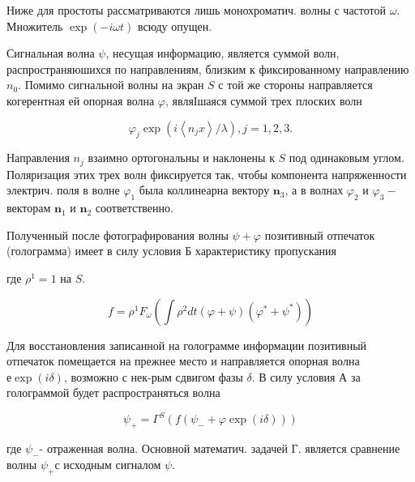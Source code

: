 \documentclass[10pt]{article}
\begin{document}
Ниже для простоты рассматриваются лишь монохроматич. волны с частотой $\omega$. Множитель $\exp (-i \omega t)$ всюду опущен.



Сигнальная волна $\psi$, несущая информацию, является суммой волн, распространяюшихся по направлениям, близким к фиксированному направлению $n_{0}$. Помимо сигнальной волны на экран $S$ с той же стороны направляется когерентная ей опорная волна $\varphi$, являІшаяся суммой трех плоских волн



\[

\varphi_{j} \exp \left(i\left\langle n_{j} x\right\rangle / \lambda\right), j=1,2,3 .

\]



Направления $n_{j}$ взаимно ортогональны и наклонены к $S$ под одинаковым углом. Поляризация этих трех волн фиксируется так, чтобы компонента напряженности электрич. поля в волне $\varphi_{1}$ была коллинеарна вектору $\boldsymbol{n}_{3}$, а в волнах $\varphi_{2}$ и $\varphi_{3}-$ векторам $\boldsymbol{n}_{1}$ и $\boldsymbol{n}_{2}$ соответственно.



Полученный после фотографирования волны $\psi+\varphi$ позитивный отпечаток (голограмма) имеет в силу условия Б характеристику пропускания



где $\rho^{1}=1$ на $S$.



\[

f=\rho^{1} F_{\omega}\left(\int \rho^{2} d t(\varphi+\psi)\left(\varphi^{*}+\psi^{*}\right)\right)

\]



Для восстановления записанной на голограмме информации позитивный отпечаток помещается на прежнее место и направляется опорная волна $е \exp (i \delta)$, возможно с нек-рым сдвигом фазы $\delta$. В силу условия А за голограммой будет распространяться волна



\[

\psi_{+}=\Gamma^{S}\left(f\left(\psi_{-}+\varphi \exp (i \delta)\right)\right)

\]



где $\psi_{-}$- отраженная волна. Основной математич. задачей Г. является сравнение волны $\psi_{+}$с исходным сигналом $\psi$.
\end{document}
